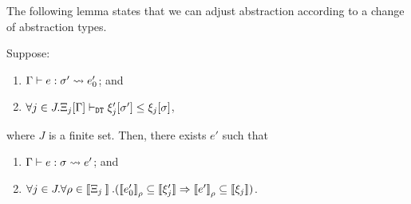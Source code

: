 The following lemma states that we can adjust abstraction according to a change of abstraction types.
\begin{lemma}
\label{lem:relcomp-coerce}
Suppose:
\begin{enumerate}
\item \(\Gamma \vdash e : \sigma' \leadsto e_0'\); and 
\item \(\forall j\in J.\Xi_j[\Gamma] \vdash_{\texttt{DT}} \xi'_j[\sigma'] \leq \xi_j[\sigma]\),
\end{enumerate}
where \(J\) is a finite set.
Then, there exists \(e'\) such that
\begin{enumerate}
\item \(\Gamma \vdash e : \sigma \leadsto e'\); and 
\item \(\forall j\in J.\forall \env\in \sem{\Xi_j}.
(\esem{e_0'}{\env}\subseteq \sem{\xi_j'}\imply \esem{e'}{\env}\subseteq \sem{\xi_j})\).
\end{enumerate}
\end{lemma}
